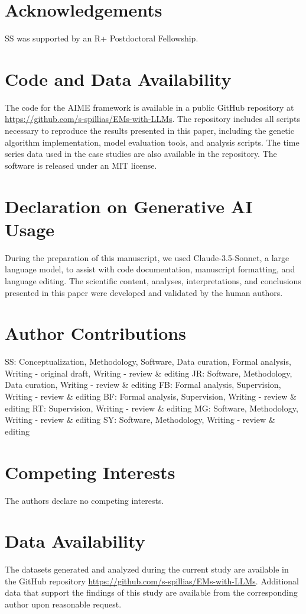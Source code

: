 
\section*{Acknowledgements}
SS was supported by an R+ Postdoctoral Fellowship. 

\section*{Code and Data Availability}
The code for the AIME framework is available in a public GitHub repository at \url{https://github.com/s-spillias/EMs-with-LLMs}. The repository includes all scripts necessary to reproduce the results presented in this paper, including the genetic algorithm implementation, model evaluation tools, and analysis scripts. The time series data used in the case studies are also available in the repository. The software is released under an MIT license.

\section*{Declaration on Generative AI Usage}
During the preparation of this manuscript, we used Claude-3.5-Sonnet, a large language model, to assist with code documentation, manuscript formatting, and language editing. The scientific content, analyses, interpretations, and conclusions presented in this paper were developed and validated by the human authors. 

\section*{Author Contributions}
SS: Conceptualization, Methodology, Software, Data curation, Formal analysis, Writing - original draft, Writing - review \& editing
JR: Software, Methodology, Data curation, Writing - review \& editing
FB: Formal analysis, Supervision, Writing - review \& editing
BF: Formal analysis, Supervision, Writing - review \& editing
RT: Supervision, Writing - review \& editing
MG: Software, Methodology, Writing - review \& editing
SY: Software, Methodology, Writing - review \& editing

\section*{Competing Interests}
The authors declare no competing interests.

\section*{Data Availability}
The datasets generated and analyzed during the current study are available in the GitHub repository \url{https://github.com/s-spillias/EMs-with-LLMs}. Additional data that support the findings of this study are available from the corresponding author upon reasonable request.

